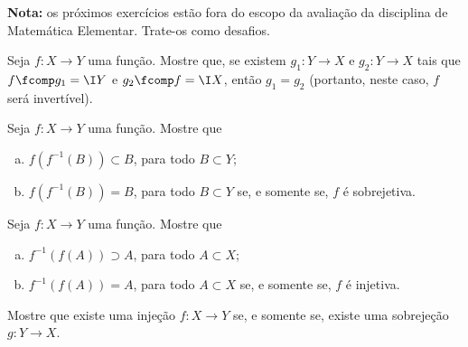 \textbf{Nota:} os próximos exercícios estão fora do escopo da avaliação da disciplina de Matemática Elementar.
Trate-os como desafios.

\begin{challenge}
    Seja $f: X \to Y$ uma função. Mostre que, se existem $g_1 : Y
\to X$ e $g_2 : Y \to X$ tais que $f \fcomp g_1 = \I Y$ e $g_2 \fcomp
f = \I X$, então $g_1 = g_2$ (portanto, neste caso, $f$ será
invertível).
\end{challenge}

\begin{challenge}
    Seja $f: X \to Y$ uma função. Mostre que
\begin{enumerate}[(a)]
  \item $f(f^{-1}(B)) \subset B$, para todo $B \subset Y$;
  \item $f(f^{-1}(B)) = B$, para todo $B \subset Y$ se, e
  somente se, $f$ é sobrejetiva.
\end{enumerate}
\end{challenge}

\begin{challenge}
    Seja $f: X \to Y$ uma função. Mostre que
\begin{enumerate}[(a)]
  \item $f^{-1}(f(A)) \supset A$, para todo $A \subset X$;
  \item $f^{-1}(f(A)) = A$, para todo $A \subset X$ se, e
  somente se, $f$ é injetiva.
\end{enumerate}
\end{challenge}

\begin{challenge}
    Mostre que existe uma injeção $f: X \to Y$ se, e somente se,
existe uma sobrejeção $g: Y \to X$.
\end{challenge}


